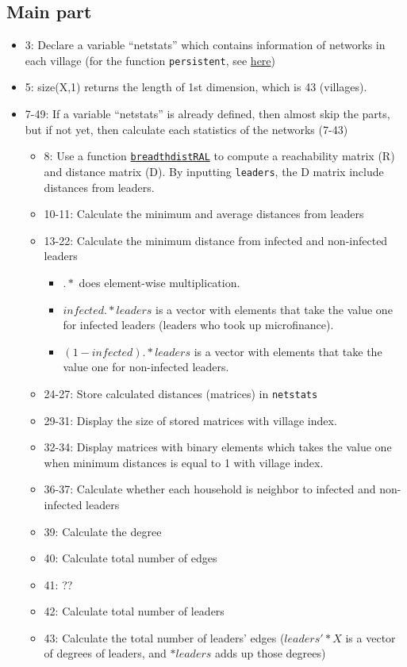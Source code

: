 \documentclass[10pt,letterpaper]{article}
\begin{document}
\subsection*{Main part}
\begin{itemize}
  \item 3: Declare a variable ``netstats'' which contains information of networks in each village (for the function \texttt{persistent}, see \href{https://www.mathworks.com/help/matlab/ref/persistent.html}{here})
  \item 5: size(X,1) returns the length of 1st dimension, which is 43 (villages).
  \item 7-49: If a variable ``netstats'' is already defined, then almost skip the parts, but if not yet, then calculate each statistics of the networks (7-43)
    \begin{itemize}
      \item 8: Use a function \hyperref[breadthdistRAL]{\texttt{breadthdistRAL}} to compute a reachability matrix (R) and distance matrix (D). By inputting \texttt{leaders}, the D matrix include distances from leaders. 
      \item 10-11: Calculate the minimum and average distances from leaders
      \item 13-22: Calculate the minimum distance from infected and non-infected leaders
      	\begin{itemize}
      		\item $.*$ does element-wise multiplication. 
      		\item $infected.*leaders$ is a vector with elements that take the value one for infected leaders (leaders who took up microfinance). 
      		\item $(1-infected).*leaders$ is a vector with elements that take the value one for non-infected leaders.
      	\end{itemize}
      \item 24-27: Store calculated distances (matrices) in \texttt{netstats}
      \item 29-31: Display the size of stored matrices with village index.
      \item 32-34: Display matrices with binary elements which takes the value one when minimum distances is equal to 1 with village index.
      \item 36-37: Calculate whether each household is neighbor to infected and non-infected leaders
      \item 39: Calculate the degree
      \item 40: Calculate total number of edges
      \item 41: ??
      \item 42: Calculate total number of leaders
      \item 43: Calculate the total number of leaders' edges ($leaders'*X$ is a vector of degrees of leaders, and $*leaders$ adds up those degrees)


\end{itemize}
\end{itemize}
\end{document}
